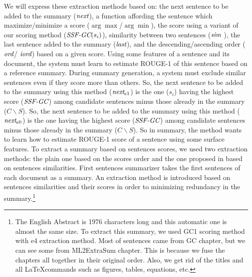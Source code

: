 We will express these extraction methods based on: the next sentence to be added to the summary ($ \operatorname{\textit{next}} $), a function affording the sentence which maximize/minimize a score ($ \arg\max $/$ \arg\min $), the score using a variant of our scoring method ($\operatorname{\textit{SSF-GC}}(s_i) $), similarity between two sentences ($ \operatorname{\textit{sim}} $ ), the last sentence added to the summary ($ \operatorname{\textit{last}} $), and the descending/ascending order ($ \operatorname{\textit{ord}} $/ $ \operatorname{\textit{iord}} $) based on a given score.
Using some features of a sentence and its document, the system must learn to estimate ROUGE-1 of this sentence based on a reference summary.
During summary generation, a system must exclude similar sentences even if they score more than others.
So, the next sentence to be added to the summary using this method ($\operatorname{\textit{next}}_{e1}$) is the one ($s_i$) having the highest score ($ \operatorname{\textit{SSF-GC}} $) among candidate sentences minus those already in the summary ($ C\backslash S $).
So, the next sentence to be added to the summary using this method ($\operatorname{\textit{next}}_{e0}$) is the one having the highest score ($ \operatorname{\textit{SSF-GC}} $) among candidate sentences minus those already in the summary ($ C\backslash S $).
So in summary, the method wants to learn how to estimate ROUGE-1 score of a sentence using some surface features.
To extract a summary based on sentences scores, we used two extraction methods: the plain one based on the scores order and the one proposed in based on sentences similarities.
First sentences summarizer takes the first sentences of each document as a summary.
An extraction method is introduced based on sentences similarities and their scores in order to minimizing redundancy in the summary.\footnote{The English Abstract is 1976 characters long and this automatic one is almost the same size. To extract this summary, we used GC1 scoring method with e4 extraction method. Most of sentences came from GC chapter, but we can see some from ML2ExtraSum chapter. This is because we fuse the chapters all together in their original order. Also, we get rid of the titles and all \LaTeX commands such as figures, tables, equations, etc.}
